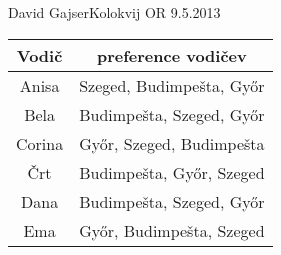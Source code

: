 \begin{naloga}{David Gajser}{Kolokvij OR 9.5.2013}
\begin{vprasanje}
\begin{enumerate}[(a)]
\begin{center}
\bigskip
\begin{tabular}{c|c}
Vodič  & preference vodičev \\ \hline
Anisa  & Szeged, Budimpešta, Győr \\
Bela   & Budimpešta, Szeged, Győr \\
Corina & Győr, Szeged, Budimpešta \\
Črt    & Budimpešta, Győr, Szeged \\
Dana   & Budimpešta, Szeged, Győr \\
Ema    & Győr, Budimpešta, Szeged
\end{tabular}
\end{center}
\end{enumerate}
\end{vprasanje}
\begin{odgovor}
\end{odgovor}
\end{naloga}
